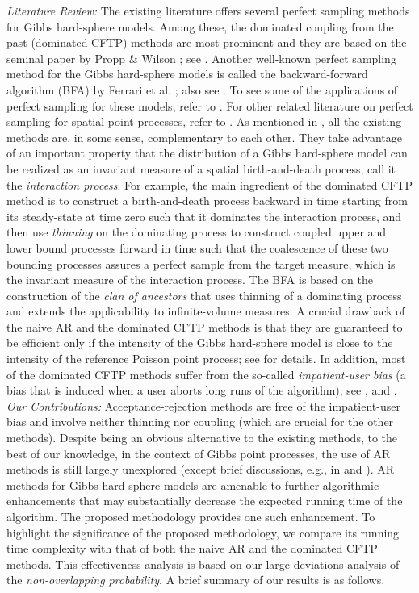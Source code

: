 \documentclass[11pt]{article}
\begin{document}
{\em Literature Review:}
{The existing literature offers several perfect sampling methods for Gibbs hard-sphere models. Among these,  
the dominated coupling from the past (dominated CFTP) methods are most prominent and they are based on the seminal paper by Propp \& Wilson \cite{PW96}}; see \cite{KM00, KW98, MH12, Kendall15}. 
Another well-known perfect sampling method for the Gibbs hard-sphere models is called the backward-forward algorithm (BFA) by Ferrari et al. \cite{FFG02}; also see \cite{MH16, GNL00}.
{To see some of the applications of perfect sampling for these models, refer to \cite{BKM08, BM06, MPB06}.
For other related literature on perfect sampling for spatial point processes, refer to \cite{JMR10, HVM99}.}
As mentioned in \cite{GNL00}, all the existing methods are, in some sense, complementary to each other.
They take advantage of an important property that the distribution of a Gibbs hard-sphere model can be realized as an invariant measure of a spatial birth-and-death process,
call it the {\em interaction process}. For example, the main ingredient of the dominated CFTP method is to construct a birth-and-death process backward in time starting from its steady-state at time zero such that it dominates the interaction process, and then use {\it thinning} on the dominating process to construct coupled upper and lower bound processes forward in time such that the coalescence of these two bounding processes assures a perfect sample from the target measure, which is the invariant measure of the interaction process. The BFA is based on the construction of the {\it clan of ancestors} that uses thinning of a dominating process and extends the applicability to infinite-volume measures. 
A crucial drawback of the naive AR and the dominated CFTP methods is that they are guaranteed to be efficient only if the intensity of the Gibbs hard-sphere model is close to the intensity of the reference Poisson point process; see \cite{MH16} for details. In addition, most of the dominated CFTP methods suffer from the so-called {\it impatient-user bias} (a bias that is induced when a user aborts long runs of the algorithm); see \cite{Fill98}, \cite{FMMR00} and \cite{Thon99}.\\


{\em Our Contributions:}
Acceptance-rejection methods are free of the impatient-user bias and involve neither thinning nor coupling (which are crucial for the other methods).
Despite being an obvious alternative to the existing methods, to the best of our knowledge, in the context of Gibbs point processes,
the use of AR methods is still largely unexplored (except brief discussions, e.g., in \cite{FJMM15} and \cite{MH16}).
AR methods for Gibbs hard-sphere models are amenable to further algorithmic enhancements that may substantially decrease the expected running time of the algorithm.
The proposed methodology provides one such enhancement. To highlight the significance of the proposed methodology,
we compare its running time complexity with that of both the naive AR and the dominated CFTP methods.
This effectiveness analysis is based on our large deviations analysis of the {\em non-overlapping probability}. A brief summary of our results is as follows.
\end{document}
